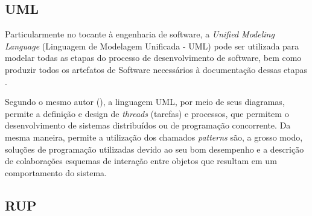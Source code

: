 \subsection{UML}

Particularmente no tocante à engenharia de software, a \textit{Unified Modeling Language} (Linguagem de Modelagem Unificada - UML) pode ser utilizada para modelar todas as etapas do processo de desenvolvimento de software, bem como produzir todos os artefatos de Software necessários à documentação dessas etapas \cite[p. 11-12]{eng-2015}.

Segundo o mesmo autor (\citeyear{eng-2015}), a linguagem UML, por meio de seus diagramas, permite a definição e design de \textit{threads} (tarefas) e processos, que permitem o desenvolvimento de sistemas distribuídos ou de programação concorrente. Da mesma maneira, permite a utilização dos chamados \textit{patterns} são, a grosso modo, soluções de programação utilizadas devido ao seu bom desempenho e a descrição de colaborações esquemas de interação entre objetos que resultam em um comportamento do sistema.

\subsection{RUP}